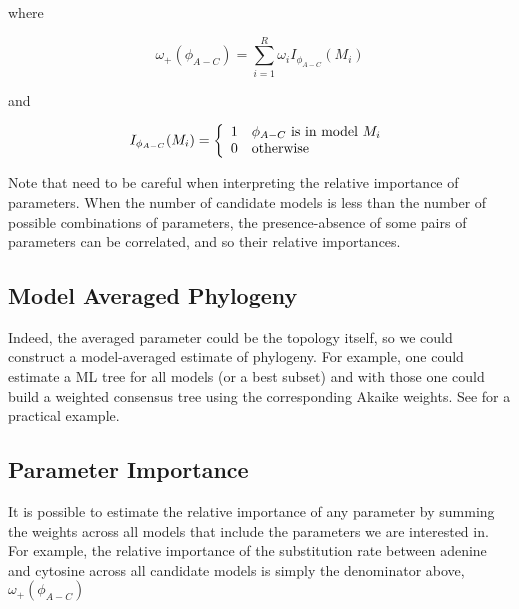 \documentclass[11pt,twoside,a4paper]{article}
\begin{document}
where

\[
\omega_+(\phi_{A-C}) = \sum_{i=1}^R \omega_i I_{\phi_{A-C}}(M_i)
\]

and

\[
I_{\phi_{A-C}}(M_i) = \left\{ 
\begin{array}{c l}
1 &  \mbox{$\phi_{A-C}$ is in model $M_i$}\\
0 & \mbox{otherwise}
\end{array}
\right.
\]

Note that need to be careful when interpreting the relative importance of parameters. When the number of candidate models is less than the number of possible combinations of parameters, the presence-absence of some pairs of parameters can be correlated, and so their relative importances.

\subsection{Model Averaged Phylogeny}

Indeed, the averaged parameter could be the topology itself, so we could construct a model-averaged estimate of phylogeny. For example, one could estimate a ML tree for all models (or a best subset) and with those one could build a weighted consensus tree using the corresponding Akaike weights. See \citet{Posada-2004} for a practical example.

\subsection{Parameter Importance}

It is possible to estimate the relative importance of any parameter by summing the weights across all models that include the parameters we are interested in. For example, the relative importance of the substitution rate between adenine and cytosine across all candidate models is simply the denominator above, $\omega_+(\phi_{A-C})$



%
%
%
%
%

\end{document}
